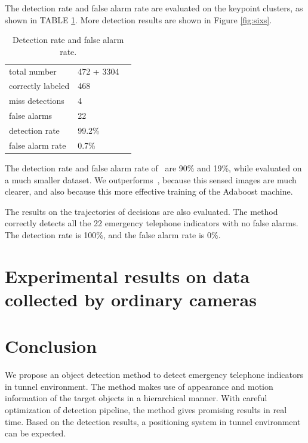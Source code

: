 The detection rate and false alarm rate are evaluated on the keypoint clusters, as shown in TABLE \ref{tb:tb2}.
More detection results are shown in Figure \ref{fig:sixs}.
\begin{table}[h]
\centering
\begin{tabular}{lll}
     \hline
     \hline
    total number &	472 + 3304  \\
    correctly labeled &	468   \\
    miss detections &	4 &	  \\
    false alarms &	22    \\
    detection rate &	99.2\% &	  \\
    false alarm rate &	0.7\% &	   \\
   \hline
\end{tabular}
\caption{Detection rate and false alarm rate.}\label{tb:tb2}
\end{table}

The detection rate and false alarm rate of~\cite{wang1} are 90\% and 19\%, while evaluated on a much smaller dataset. We outperforms~\cite{wang1}, because this sensed images are much clearer, and also because this more effective training of the Adaboost machine.

The results on the trajectories of decisions are also evaluated. The method correctly detects all the 22 emergency telephone indicators with no false alarms. The detection rate is 100\%, and the false alarm rate is 0\%.
\section{Experimental results on data collected by ordinary cameras}
\label{ord}

\section{Conclusion}
\label{conc}
We propose an object detection method to detect emergency telephone indicators in tunnel environment. The method makes use of appearance and motion information of the target objects in a hierarchical manner. With careful optimization of detection pipeline, the method gives promising results in real time. Based on the detection results, a positioning system in tunnel environment can be expected.
